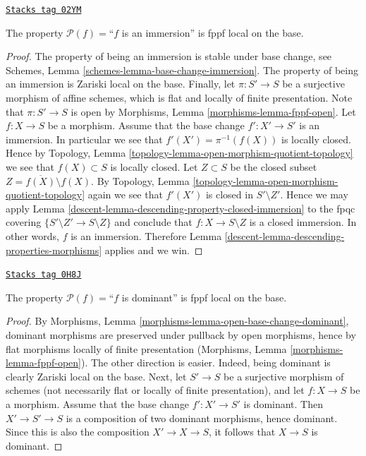 \begin{lemma}
\label{descent-lemma-descending-fppf-property-immersion}
\href{https://stacks.math.columbia.edu/tag/02YM}{\texttt{Stacks tag 02YM}}

The property $\mathcal{P}(f) =$``$f$ is an immersion''
is fppf local on the base.
\end{lemma}

\begin{proof}

The property of being an immersion is stable under base change,
see Schemes, Lemma \ref{schemes-lemma-base-change-immersion}.
The property of being an immersion is Zariski local on the base.
Finally, let
$\pi : S' \to S$ be a surjective morphism of affine schemes,
which is flat and locally of finite presentation.
Note that $\pi : S' \to S$ is open by
Morphisms, Lemma \ref{morphisms-lemma-fppf-open}.
Let $f : X \to S$ be a morphism.
Assume that the base change $f' : X' \to S'$ is an immersion.
In particular we see that $f'(X') = \pi^{-1}(f(X))$ is locally closed.
Hence by Topology, Lemma \ref{topology-lemma-open-morphism-quotient-topology}
we see that $f(X) \subset S$
is locally closed. Let $Z \subset S$ be
the closed subset $Z = \overline{f(X)} \setminus f(X)$.
By Topology, Lemma \ref{topology-lemma-open-morphism-quotient-topology}
again we see that $f'(X')$ is closed in $S' \setminus Z'$.
Hence we may apply Lemma \ref{descent-lemma-descending-property-closed-immersion}
to the fpqc covering $\{S' \setminus Z' \to S \setminus Z\}$
and conclude that $f : X \to S \setminus Z$ is a closed
immersion. In other words, $f$ is an immersion.
Therefore Lemma \ref{descent-lemma-descending-properties-morphisms} applies and we win.
\end{proof}

\begin{lemma}
\label{descent-lemma-descending-fppf-property-dominant}
\href{https://stacks.math.columbia.edu/tag/0H8J}{\texttt{Stacks tag 0H8J}}

The property $\mathcal{P}(f) =$``$f$ is dominant''
is fppf local on the base.
\end{lemma}

\begin{proof}
By Morphisms, Lemma \ref{morphisms-lemma-open-base-change-dominant},
dominant morphisms are preserved
under pullback by open morphisms, hence
by flat morphisms locally of finite presentation
(Morphisms, Lemma \ref{morphisms-lemma-fppf-open}).
The other direction is easier.
Indeed, being dominant is clearly Zariski local on the base.
Next, let $S' \to S$ be a surjective morphism of schemes
(not necessarily flat or locally of finite
presentation),
and let $f : X \to S$ be a morphism. Assume that the base change
$f' : X' \to S'$ is dominant. Then $X' \to S'\to S$ is a composition
of two dominant morphisms, hence dominant. Since this is also
the composition $X' \to X \to S$, it follows that $X\to S$ is dominant.
\end{proof}

